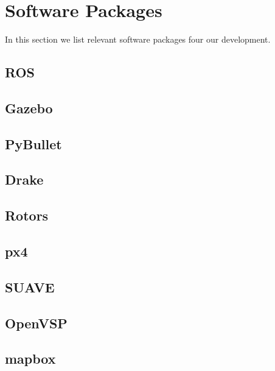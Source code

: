 \section{Software Packages}

In this section we list relevant software packages four our development.

\subsection{ROS}
\subsection{Gazebo}
\subsection{PyBullet}
\subsection{Drake}
\subsection{Rotors}
\subsection{px4}
\subsection{SUAVE}
\subsection{OpenVSP}
\subsection{mapbox}
